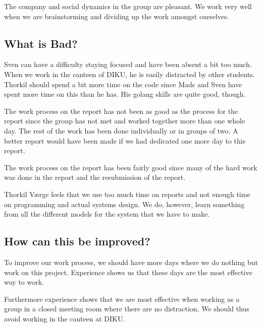 \documentclass[11pt,a4paper]{report}
\begin{document}
The company and social dynamics in the group are pleasant. We work very well when we are brainstorming and dividing up the work amongst ourselves.

\subsection{What is Bad?}
Sven can have a difficulty staying focused and have been absent a bit too much. When we work in the canteen of DIKU, he is easily distracted by other students. Thorkil should spend a bit more time on the code since Mads and Sven have spent more time on this than he has. His golang skills are quite good, though.

The work process on the  report has not been as good as the process for the  report since the group has not met and worked together more than one whole day. The rest of the work has been done individually or in groups of two. A better report would have been made if we had dedicated one more day to this report.

The work process on the  report has been fairly good since many of the hard work was done in the  report and the resubmission of the  report.

Thorkil Værge feels that we use too much time on reports and not enough time on programming and actual systems design. We do, however, learn something from all the different models for the system that we have to make.

\subsection{How can this be improved?}
To improve our work process, we should have more days where we do nothing but work on this project. Experience shows us that these days are the most effective way to work.

Furthermore experience shows that we are most effective when working as a group in a closed meeting room where there are no distraction. We should thus avoid working in the canteen at DIKU.
\end{document}
